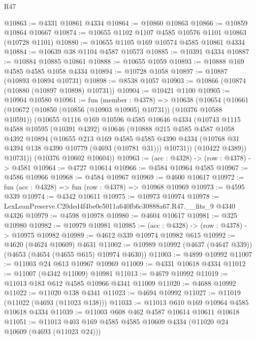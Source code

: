 \begin{lexlean}{R47}
\begin{coremodule}
@10863 := @4331 @10861 @4334
@10864 := @10860 @10863
@10866 := @10859 @10864 @10667
@10874 := @10655 @1102 @1107 @4585 @10576 @1101 @10863 (@10728 @1101)
@10880 := @10655 @1105 @169 @10574 @4585 @10861 @4334
@10884 := @10639 @38 @1104 @4587 @10573
@10885 := @10391 @4334
@10887 := @10884 @10885 @10861
@10888 := @10655 @1059
@10893 := @10888 @169 @4585 @4585 @1058 @4334
@10894 := @10728 @1058
@10897 := @10887 (@10893 @10894 @10731)
@10898 := @8538 @1057
@10903 := @10866 (@10874 (@10880 (@10897 @10898) @10731))
@10904 := @10421 @1100
@10905 := @10904 @10580
@10961 := fun (member : @4378) =>
  @10638
    (@10654
      (@10661
        (@10672 (@10850 (@10856 (@10903 @10905) @10731)) (@10376 @10588 @10591))
        (@10655
          @1116
          @169
          @10596
          @4585
          @10646
          @4334
          (@10743
            @1115
            @4588
            @10595
            (@10391 @4392)
            @10646
            (@10888
              @215
              @4585
              @4587
              @1058
              @4392
              @10894
              (@10655
                @213
                @169
                @4585
                @4585
                @4390
                @4334
                (@10768 @31 @4394 @138 @4390 @10779 (@4693 (@10781 @31)))
                @10731))
            (@10422 @4389))
          @10731))
      (@10376 @10602 @10604))
@10963 := (acc : @4328) -> (row : @4378) -> @4581
@10964 := @4727 @10614
@10966 := @4584 @10964 @4585
@10967 := @4586 @10966
@10968 := @4584 @10967
@10969 := @4600 @10617
@10972 := fun (acc : @4328) => fun (row : @4378) => @10968 @10969
@10973 := @4595 @339
@10974 := @4342 @10611
@10975 := @10973 @10974
@10978 := LexLeanPreserve.C20ded4f4be0e5011a640fb6c30888a67.R47.__fits_9 @4340 @4326
@10979 := @4598 @10978
@10980 := @4604 @10617
@10981 := @325 @10980
@10982 := @10979 @10981
@10985 := (acc : @4328) -> (row : @4378) -> @10975 @10982
@10989 := @4612 @339 @10974 @10982 @615
@10992 := @4620 (@4624 @10609) @4631
@11002 := @10989 @10992 (@4637 (@4647 @339)) (@4653 (@4654 (@4655 @615) @10974 @4630))
@11003 := @4899 @10992
@11007 := @11003 @24 @613 @10967 @10969
@11009 := @4331 @10618 @4334
@11012 := @11007 (@4342 @11009) @10981
@11013 := @4679 @10992
@11019 := @11013 @183 @612 @4585 @10966 @4341 @11009
@11020 := @4688 @10992
@11022 := @11020 @138 @4341
@11023 := @4694 @10992
@11027 := @11019 (@11022 (@4693 (@11023 @138)))
@11033 := @11013 @610 @169 @10964 @4585 @10618 @4334
@11039 := @11003 @608 @462 @4587 @10614 @10611 @10618
@11051 := @11013 @403 @169 @4585 @4585 @10609 @4334 (@11020 @24 @10609 (@4693 (@11023 @24)))

\end{coremodule}
\end{lexlean}
